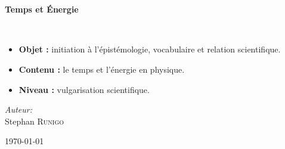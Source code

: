 \begin{titlepage}
%
~\\[1cm]

\begin{center}
\end{center}

\textsc{\Large }\\[0.5cm]

\HRule

\begin{center}
{\huge \bfseries  Temps et Énergie\\ }
 
\end{center}

\HRule \\[1.5cm]

\vspace{3cm}
\begin{itemize}[leftmargin=1cm, label=, itemsep=2pt]
\item {\bf Objet :} initiation à l'épistémologie, vocabulaire et relation scientifique.
\item {\bf Contenu :} le temps et l'énergie en physique.
\item {\bf Niveau :} vulgarisation scientifique.
\end{itemize}
\vspace{3cm}


\begin{minipage}{0.4\textwidth}
\begin{flushleft} \large
\end{flushleft}
\end{minipage}
\begin{minipage}{0.4\textwidth}
\begin{flushright} \large
\emph{Auteur:}\\
Stephan \textsc{Runigo}
\end{flushright}
\end{minipage}

\vfill

{\large \today}

\end{titlepage}
